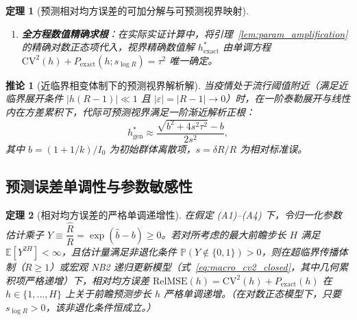 \documentclass[11pt,a4paper]{article}
\theoremstyle{plain}
\newtheorem{theorem}{定理}
\newtheorem{corollary}{推论}
\theoremstyle{definition}
\begin{document}
\begin{theorem}[预测相对均方误差的可加分解与可预测视界映射]
\begin{enumerate}
\begin{equation}
\begin{cases}
\infty, & \tau^2 \ge \text{CV}^2_\infty \text{ 且 } R > 1, \\[3pt]
0, & \tau^2 < \text{CV}^2(1).
\end{cases}
\label{eq:h_stoch_bound}
\end{equation}
其中式~\eqref{eq:h_stoch_bound} 给出连续阈值根，离散机制视界取下整 $H^*_{\text{stoch}} = \lfloor h^*_{\text{stoch}} \rfloor$；近临界与亚临界连续解分别满足 $h^*_{\text{stoch}} = \frac{I_0\tau^2}{1+1/k}$ 与 $h^*_{\text{stoch}} = -\frac{\ln[1+I_0(1-R)\tau^2/(1+R/k)]}{\ln R}$。
\item \textbf{全方程数值精确求根}：在实际实证计算中，将引理~\ref{lem:param_amplification} 的精确对数正态项代入，视界精确数值解 $h^*_{\text{exact}}$ 由单调方程 $\text{CV}^2(h) + P_{\text{exact}}(h; s_{\log R}) = \tau^2$ 唯一确定。
\end{enumerate}
\end{theorem}


\begin{corollary}[近临界相变体制下的预测视界解析解]\label{cor:near_crit_horizon}
当疫情处于流行阈值附近（满足近临界展开条件 $|h(R - 1)| \ll 1$ 且 $|\varepsilon| = |R - 1| \to 0$）时，在一阶泰勒展开与线性内在方差累积下，代际可预测视界满足一阶渐近解析正根：
\begin{equation}
h^*_{\text{gen}} \approx \frac{\sqrt{b^2 + 4 s^2 \tau^2} - b}{2 s^2},
\label{eq:crit_horizon}
\end{equation}
其中 $b = (1+1/k)/I_0$ 为初始群体离散项，$s = \delta R / R$ 为相对标准误。
\end{corollary}


\subsection{预测误差单调性与参数敏感性}

\begin{theorem}[相对均方误差的严格单调递增性]\label{thm:monotonicity}
在假定 (A1)--(A4) 下，令归一化参数估计乘子 $Y \equiv \dfrac{\hat{R}}{R} = \exp(\hat{b}-b) \ge 0$。若对所考虑的最大前瞻步长 $H$ 满足 $\mathbb{E}[Y^{2H}] < \infty$，且估计量满足非退化条件 $\mathbb{P}(Y \notin \{0, 1\}) > 0$，则在超临界传播体制（$R \ge 1$）或宏观 NB2 递归更新模型（式~\eqref{eq:macro_cv2_closed}，其中几何累积项严格递增）下，相对均方误差 $\text{RelMSE}(h) = \text{CV}^2(h) + P_{\text{exact}}(h)$ 在 $h \in \{1, \dots, H\}$ 上关于前瞻预测步长 $h$ 严格单调递增。（在对数正态模型下，只要 $s_{\log R} > 0$，该非退化条件恒成立。）
\end{theorem}
\end{document}
